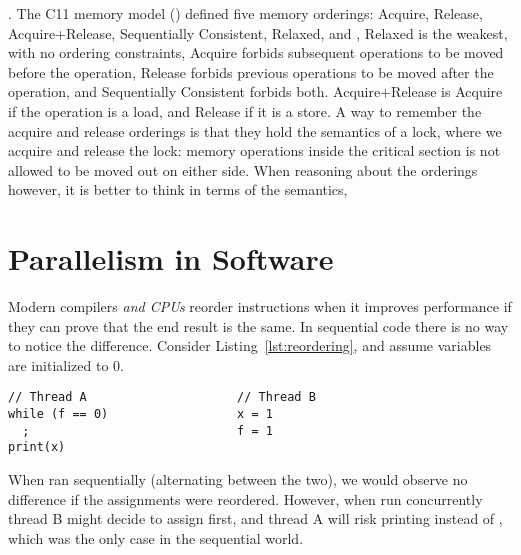 \documentclass[b5paper,twoside]{report}
\begin{document}
.  The C11 memory model () defined five memory orderings: Acquire, Release,
Acquire+Release, Sequentially Consistent, Relaxed, and , Relaxed is the weakest, with no ordering constraints,
 Acquire forbids subsequent operations to be moved before the
operation, Release forbids previous operations to be moved after the operation,
and Sequentially Consistent forbids both.  Acquire+Release is Acquire if the
operation is a load, and Release if it is a store.  A way to remember the
acquire and release orderings is that they hold the semantics of a lock, where
we acquire and release the lock: memory operations inside the critical section
is not allowed to be moved out on either side.  When reasoning about the
orderings however, it is better to think in terms of the semantics,







\section{Parallelism in Software}

Modern compilers \emph{and CPUs} reorder instructions when it improves
performance if they can prove that the end result is the same.  In sequential
code there is no way to notice the difference.  Consider
Listing~\ref{lst:reordering}, and assume variables are initialized to 0.
\begin{lstlisting}[caption=Instruction reordering,label=lst:reordering]
// Thread A                     // Thread B
while (f == 0)                  x = 1
  ;                             f = 1
print(x)
\end{lstlisting}
When ran sequentially (alternating between the two), we would observe no
difference if the assignments were reordered. However, when run concurrently
thread B might decide to assign  first, and thread A will risk
printing  instead of , which was the only case in the
sequential world.
\end{document}
